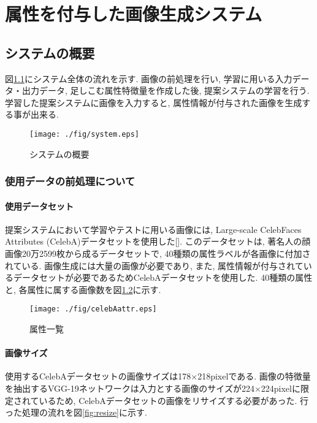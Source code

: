 \chapter{属性を付与した画像生成システム}

\section{システムの概要}

図\ref{fig:system}にシステム全体の流れを示す. 画像の前処理を行い, 学習に用いる入力データ・出力データ, 足しこむ属性特徴量を作成した後, 提案システムの学習を行う. 学習した提案システムに画像を入力すると, 属性情報が付与された画像を生成する事が出来る. 
\begin{figure}[H]
	\begin{center}
		\texttt{[image: ./fig/system.eps]}
		\caption{システムの概要}
		\label{fig:system}
	\end{center}
\end{figure}

\subsection{使用データの前処理について}

\subsubsection{使用データセット}
提案システムにおいて学習やテストに用いる画像には, Large-scale CelebFaces Attributes (CelebA)データセットを使用した[]. このデータセットは, 著名人の顔画像20万2599枚から成るデータセットで, 40種類の属性ラベルが各画像に付加されている. 画像生成には大量の画像が必要であり, また, 属性情報が付与されているデータセットが必要であるためCelebAデータセットを使用した. 40種類の属性と, 各属性に属する画像数を図\ref{fig:celebAattr}に示す. 

\begin{figure}[H]
 \begin{center}
  \texttt{[image: ./fig/celebAattr.eps]}
  \caption{属性一覧}
  \label{fig:celebAattr}
 \end{center}
\end{figure}


\subsubsection{画像サイズ}
使用するCelebAデータセットの画像サイズは178×218pixelである. 画像の特徴量を抽出するVGG-19ネットワークは入力とする画像のサイズが224×224pixelに限定されているため, CelebAデータセットの画像をリサイズする必要があった. 行った処理の流れを図\ref{fig:resize}に示す. 

